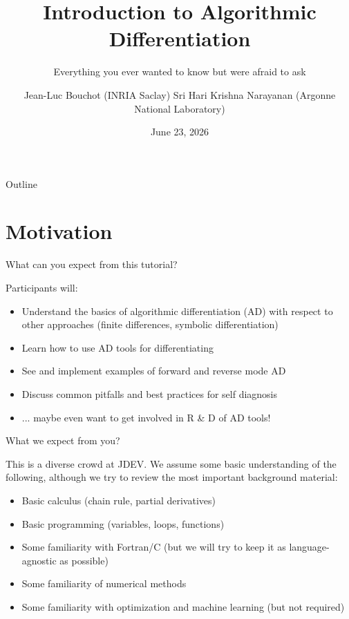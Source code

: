 \documentclass[12pt,xcolor={table}]{beamer}
\title{Introduction to Algorithmic Differentiation}
\subtitle{Everything you ever wanted to know but were afraid to ask}
\author{Jean-Luc Bouchot (INRIA Saclay) \newline{} Sri Hari Krishna Narayanan (Argonne National Laboratory)}
\date{June 23, 2026}
\begin{document}
\begin{frame}
\titlepage
\end{frame}

\begin{frame}{Outline}
\tableofcontents
\end{frame}

\section{Motivation}

\begin{frame}{What can you expect from this tutorial?}

  Participants will:
  \begin{itemize}
    \item Understand the basics of algorithmic differentiation (AD) with respect to other approaches (finite differences, symbolic differentiation)
    \item Learn how to use AD tools for differentiating
    \item See and implement examples of forward and reverse mode AD
    \item Discuss common pitfalls and best practices for self diagnosis
    \item ... maybe even want to get involved in R \& D of AD tools!
  \end{itemize}

\end{frame}

\begin{frame}{What we expect from you?}

  This is a diverse crowd at JDEV.
  We assume some basic understanding of the following, although we try to review the most important background material:
  \begin{itemize}
    \item Basic calculus (chain rule, partial derivatives)
    \item Basic programming (variables, loops, functions)
    \item Some familiarity with Fortran/C (but we will try to keep it as language-agnostic as possible)
    \item Some familiarity of numerical methods
    \item Some familiarity with optimization and machine learning (but not required)
  \end{itemize}

\end{frame}
\end{document}
